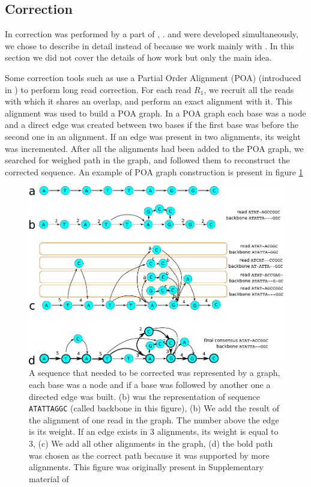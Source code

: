 \documentclass[main]{subfiles}
\begin{document}
\subsection{Correction}

In \canu correction was performed by a part of  \cite{falcon}, .  and \canu were developed simultaneously, we chose to describe \canu in detail instead of  because we work mainly with \canu. In this section we did not cover the details of how  work but only the main idea.

Some correction tools such as  use a Partial Order Alignment (POA) (introduced in \cite{poa}) to perform long read correction. For each read \texttt{$R_1$}, we recruit all the reads with which it shares an overlap, and perform an exact alignment with it. This alignment was used to build a POA graph. In a POA graph each base was a node and a direct edge was created between two bases if the first base was before the second one in an alignment. If an edge was present in two alignments, its weight was incremented. After all the alignments had been added to the POA graph, we searched for weighed path in the graph, and followed them to reconstruct the corrected sequence. An example of POA graph construction is present in figure \ref{sota:fig:canu:correction}

\begin{figure}[ht]
    \centering
    \includegraphics[width=\textwidth]{state_of_the_art/images/POA_explain.pdf}
    \caption{A sequence that needed to be corrected was represented by a graph, each base was a node and if a base was followed by another one a directed edge was built. (b) was the representation of sequence \texttt{ATATTAGGC} (called backbone in this figure), (b) We add the result of the alignment of one read in the graph. The number above the edge is its weight. If an edge exists in 3 alignments, its weight is equal to 3, (c) We add all other alignments in the graph, (d) the bold path was chosen as the correct path because it was supported by more alignments. This figure was originally present in Supplementary material of \hgap \cite{hgap}}
    \label{sota:fig:canu:correction}
\end{figure}
\end{document}
